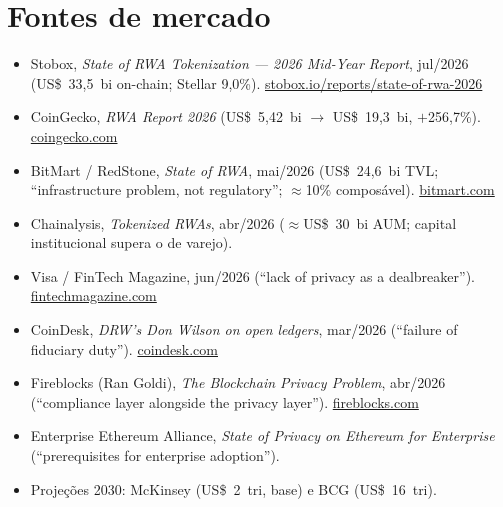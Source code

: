 \documentclass[11pt]{article}
\begin{document}
\section*{Fontes de mercado}
\footnotesize
\begin{itemize}[leftmargin=1.3em, itemsep=0.15em]
\item Stobox, \emph{State of RWA Tokenization --- 2026 Mid-Year Report}, jul/2026 (US\$~33,5~bi on-chain; Stellar 9,0\%). \href{https://www.stobox.io/reports/state-of-rwa-2026}{stobox.io/reports/state-of-rwa-2026}
\item CoinGecko, \emph{RWA Report 2026} (US\$~5,42~bi $\to$ US\$~19,3~bi, $+$256,7\%). \href{https://www.coingecko.com/research/publications/rwa-report-2026}{coingecko.com}
\item BitMart / RedStone, \emph{State of RWA}, mai/2026 (US\$~24,6~bi TVL; ``infrastructure problem, not regulatory''; $\approx$10\% composável). \href{https://www.bitmart.com/static-file/resources/public/BitMart_State_of_RWA_Issue02_May2026.pdf}{bitmart.com}
\item Chainalysis, \emph{Tokenized RWAs}, abr/2026 ($\approx$US\$~30~bi AUM; capital institucional supera o de varejo).
\item Visa / FinTech Magazine, jun/2026 (``lack of privacy as a dealbreaker''). \href{https://fintechmagazine.com/news/visa-anchoring-trust-in-next-generation-enterprise-payments}{fintechmagazine.com}
\item CoinDesk, \emph{DRW's Don Wilson on open ledgers}, mar/2026 (``failure of fiduciary duty''). \href{https://www.coindesk.com/business/2026/03/26/why-big-banks-are-snubbing-open-ledgers-to-build-their-own-private-blockchains}{coindesk.com}
\item Fireblocks (Ran Goldi), \emph{The Blockchain Privacy Problem}, abr/2026 (``compliance layer alongside the privacy layer''). \href{https://www.fireblocks.com/blog/blockchain-privacy-problem}{fireblocks.com}
\item Enterprise Ethereum Alliance, \emph{State of Privacy on Ethereum for Enterprise} (``prerequisites for enterprise adoption'').
\item Projeções 2030: McKinsey (US\$~2~tri, base) e BCG (US\$~16~tri).
\end{itemize}
\end{document}

